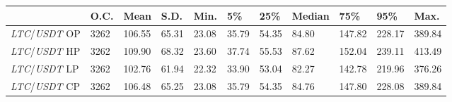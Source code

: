 \begin{tabular}{lllllllllll}
\toprule
 & \textbf{O.C.} & \textbf{Mean} & \textbf{S.D.} & \textbf{Min.} & \textbf{5\%} & \textbf{25\%} & \textbf{Median} & \textbf{75\%} & \textbf{95\%} & \textbf{Max.} \\
\midrule
\emph{LTC}/\emph{USDT} OP & 3262 & 106.55 & 65.31 & 23.08 & 35.79 & 54.35 & 84.80 & 147.82 & 228.17 & 389.84 \\
\emph{LTC}/\emph{USDT} HP & 3262 & 109.90 & 68.32 & 23.60 & 37.74 & 55.53 & 87.62 & 152.04 & 239.11 & 413.49 \\
\emph{LTC}/\emph{USDT} LP & 3262 & 102.76 & 61.94 & 22.32 & 33.90 & 53.04 & 82.27 & 142.78 & 219.96 & 376.26 \\
\emph{LTC}/\emph{USDT} CP & 3262 & 106.48 & 65.25 & 23.08 & 35.79 & 54.35 & 84.76 & 147.80 & 228.08 & 389.84 \\
\bottomrule
\end{tabular}
